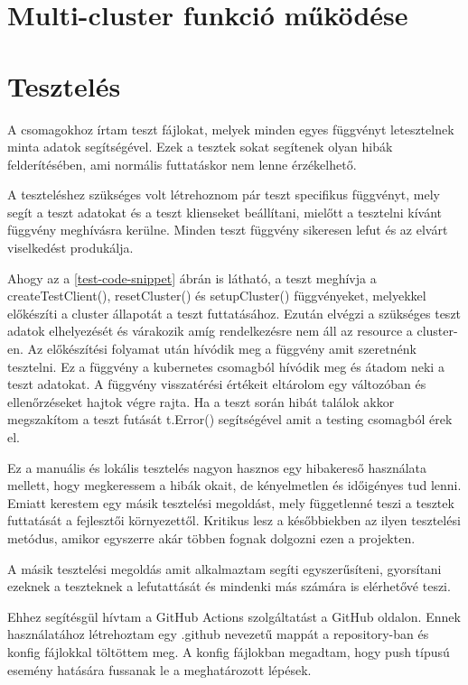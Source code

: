 \section{Multi-cluster funkció működése}



\section{Tesztelés}
A csomagokhoz írtam teszt fájlokat, melyek minden egyes függvényt letesztelnek minta adatok segítségével.
Ezek a tesztek sokat segítenek olyan hibák felderítésében, ami normális futtatáskor nem lenne érzékelhető.

A teszteléshez szükséges volt létrehoznom pár teszt specifikus függvényt, mely segít a teszt adatokat és a teszt klienseket beállítani, mielőtt a tesztelni kívánt függvény meghívásra kerülne. Minden teszt függvény sikeresen lefut és az elvárt viselkedést produkálja.

Ahogy az a \ref{test-code-snippet} ábrán is látható, a teszt meghívja a createTestClient(), resetCluster() és setupCluster() függvényeket, melyekkel előkészíti a cluster állapotát a teszt futtatásához.
Ezután elvégzi a szükséges teszt adatok elhelyezését és várakozik amíg rendelkezésre nem áll az resource a cluster-en.
Az előkészítési folyamat után hívódik meg a függvény amit szeretnénk tesztelni.
Ez a függvény a kubernetes csomagból hívódik meg és átadom neki a teszt adatokat.
A függvény visszatérési értékeit eltárolom egy változóban és ellenőrzéseket hajtok végre rajta.
Ha a teszt során hibát találok akkor megszakítom a teszt futását t.Error() segítségével amit a testing csomagból érek el.

Ez a manuális és lokális tesztelés nagyon hasznos egy hibakereső használata mellett, hogy megkeressem a hibák okait, de kényelmetlen és időigényes tud lenni.
Emiatt kerestem egy másik tesztelési megoldást, mely függetlenné teszi a tesztek futtatását a fejlesztői környezettől.
Kritikus lesz a későbbiekben az ilyen tesztelési metódus, amikor egyszerre akár többen fognak dolgozni ezen a projekten.

A másik tesztelési megoldás amit alkalmaztam segíti egyszerűsíteni, gyorsítani ezeknek a teszteknek a lefutattását és mindenki más számára is elérhetővé teszi. 

Ehhez segítésgül hívtam a GitHub Actions szolgáltatást a GitHub oldalon.
Ennek használatához létrehoztam egy .github nevezetű mappát a repository-ban és konfig fájlokkal töltöttem meg.
A konfig fájlokban megadtam, hogy push típusú esemény hatására fussanak le a meghatározott lépések.

